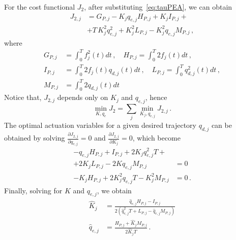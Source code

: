 For the cost functional $J_2$, after substituting~\eqref{eq:tauPEA}, we can obtain
\begin{align}
J_{2,j} &= G_{P,j} - K_j q_{e,j} H_{P,j} + K_j I_{P,j} +\nonumber\\
&+T\,K_j^2q_{e,j}^2 + K_j^2 L_{P,j} - K_j^2 q_{e,j} M_{P,j} \,,
\label{eq:IndexPEA}
\end{align}
where
\begin{align*}
G_{P,j} &= \int_{0}^{T} {f_j^2(t) dt}\,,\quad H_{P,j} = \int_{0}^{T} {2f_j(t) dt}\,,\\ 
I_{P,j} &= \int_{0}^{T} {2 f_j(t)q_{d,j}(t) dt}\,,\quad L_{P,j} = \int_{0}^{T} {q_{d,j}^2(t) dt}\,, \\
M_{P,j} &= \int_{0}^{T} {2q_{d,j}(t) dt} 
\label{eq:coefficients}
\end{align*} 
Notice that, $J_{2,j}$ depends only on $K_j$ and $q_{e,j}$, hence
\begin{equation*}
\min_{K,q_e}{J_2} = \sum_j{\min_{K_j,q_{e,j}}{J_{2,j}}} \,.
\end{equation*}
The optimal actuation variables for a given desired trajectory $q_{d,j}$ can be obtained by solving 
$
\frac{\partial J_{2,j}}{\partial q_{e,j}} = 0$ and 
$\frac{\partial J_{2,j}}{\partial K_j} = 0$,
which become
\begin{align*}
-q_{e,j}H_{P,j} + I_{P,j} +2K_jq^2_{e,j}T +\nonumber\\ +2K_jL_{P,j} -2Kq_{e,j}M_{P,j} &= 0 \\
-K_jH_{P,j}+2K_j^2q_{e,j}T-K_j^2M_{P,j} &= 0\,.
\end{align*}
Finally, solving for $K$ and $q_{e,j}$, we obtain
\begin{align}
\label{eq:optimK}
  \hat{K}_j &= \frac{\hat{q}_{e,j}H_{P,j}-I_{P,j}}{2(\hat{q}^2_{e,j}T+L_{P,j}-\hat{q}_{e,j}M_{P,j})}\\
\hat{q}_{e,j} &= \frac{H_{P,j} + \hat{K}_jM_{P,j}}{2\hat{K}_jT}\,.
\label{eq:optimq}
\end{align}

